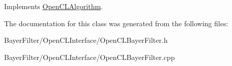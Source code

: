 Implements \hyperlink{class_open_c_l_algorithm}{Open\-C\-L\-Algorithm}.



The documentation for this class was generated from the following files\-:\begin{DoxyCompactItemize}
\item 
Bayer\-Filter/\-Open\-C\-L\-Interface/Open\-C\-L\-Bayer\-Filter.\-h\item 
Bayer\-Filter/\-Open\-C\-L\-Interface/Open\-C\-L\-Bayer\-Filter.\-cpp\end{DoxyCompactItemize}
